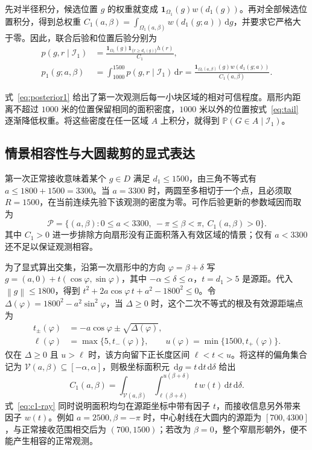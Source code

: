 \documentclass[UTF8,a4paper,zihao=-4,fontset=none]{ctexart}
\numberwithin{equation}{section}
\newcommand{\ind}{\mathbf 1}
\newcommand{\dd}{\,\mathrm d}
\newcommand{\Prob}{\mathbb P}
\newcommand{\norm}[1]{\left\lVert#1\right\rVert}
\begin{document}
先对半径积分，候选位置 \(g\) 的权重就变成 \(\ind_{\Omega_1}(g)w(d_1(g))\)。再对全部候选位置积分，得到总权重 \(C_1(a,\beta)=\int_{\Omega_1(a,\beta)}w(d_1(g;a))\dd g\)，并要求它严格大于零。因此，联合后验和位置后验分别为
\begin{equation}\label{eq:posterior1}
\begin{aligned}
p(g,r\mid\mathcal I_1)
&=\frac{\ind_{\Omega_1}(g)\ind_{\{r\ge d_1(g)\}}h(r)}{C_1},\\
p_1(g;a,\beta)
&=\int_{1000}^{1500}p(g,r\mid\mathcal I_1)\dd r
=\frac{\ind_{\Omega_1(a,\beta)}(g)w(d_1(g;a))}{C_1(a,\beta)}.
\end{aligned}
\end{equation}

式~\eqref{eq:posterior1} 给出了第一次观测后每一小块区域的相对可信程度。扇形内距离不超过 \(1000\) 米的位置保留相同的面积密度，\(1000\) 米以外的位置按式~\eqref{eq:tail} 逐渐降低权重。将这些密度在任一区域 \(A\) 上积分，就得到 \(\Prob(G\in A\mid\mathcal I_1)\)。

\subsection{情景相容性与大圆裁剪的显式表达}
第一次正常接收意味着某个 \(g\in D\) 满足 \(d_1\le1500\)，由三角不等式有 \(a\le1800+1500=3300\)。当 \(a=3300\) 时，两圆至多相切于一个点，且必须取 \(R=1500\)，在当前连续先验下该观测的密度为零。可作后验更新的参数域因而取为
\begin{equation}\label{eq:parameter-domain}
\mathcal P=\{(a,\beta):0\le a<3300,\ -\pi\le\beta<\pi,\ C_1(a,\beta)>0\}.
\end{equation}
其中 \(C_1>0\) 进一步排除方向扇形没有正面积落入有效区域的情景；仅有 \(a<3300\) 还不足以保证观测相容。

为了显式算出交集，沿第一次扇形中的方向 \(\varphi=\beta+\delta\) 写 \(g=(a,0)+t(\cos\varphi,\sin\varphi)\)，其中 \(-\alpha\le\delta\le\alpha\)，\(t=d_1>5\) 是源距。代入 \(\norm{g}\le1800\)，得到 \(t^2+2a\cos\varphi\,t+a^2-1800^2\le0\)。令 \(\Delta(\varphi)=1800^2-a^2\sin^2\varphi\)，当 \(\Delta\ge0\) 时，这个二次不等式的根及有效源距端点为
\begin{equation}\label{eq:ray-interval}
\begin{aligned}
t_\pm(\varphi)&=-a\cos\varphi\pm\sqrt{\Delta(\varphi)},\\
\ell(\varphi)&=\max\{5,t_-(\varphi)\},\qquad
u(\varphi)=\min\{1500,t_+(\varphi)\}.
\end{aligned}
\end{equation}
仅在 \(\Delta\ge0\) 且 \(u>\ell\) 时，该方向留下正长度区间 \(\ell<t<u\)。将这样的偏角集合记为 \(\mathcal V(a,\beta)\subseteq[-\alpha,\alpha]\)，则极坐标面积元 \(\dd g=t\dd t\dd\delta\) 给出
\begin{equation}\label{eq:c1-ray}
C_1(a,\beta)=\int_{\mathcal V(a,\beta)}\int_{\ell(\beta+\delta)}^{u(\beta+\delta)}t\,w(t)\dd t\dd\delta.
\end{equation}
式~\eqref{eq:c1-ray} 同时说明面积均匀在源距坐标中带有因子 \(t\)，而接收信息另外带来因子 \(w(t)\)。例如 \(a=2500,\beta=-\pi\) 时，中心射线在大圆内的源距为 \([700,4300]\)，与正常接收范围相交后为 \((700,1500)\)；若改为 \(\beta=0\)，整个窄扇形朝外，便不能产生相容的正常观测。
\end{document}
